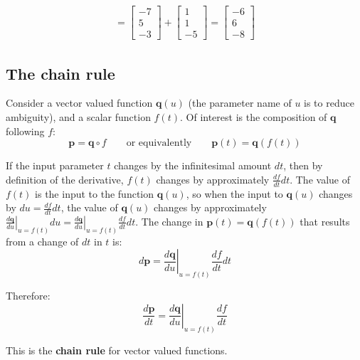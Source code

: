 \documentclass{article}
\begin{document}
\begin{itemize}
\begin{align*}
= \begin{bmatrix} -7 \\ 5 \\ -3 \end{bmatrix} + \begin{bmatrix} 1 \\ 1 \\ -5 \end{bmatrix}  
= \begin{bmatrix} -6 \\ 6 \\ -8 \end{bmatrix}
\end{align*}
\end{itemize}



\subsection*{The chain rule}

Consider a vector valued function \(\mathbf{q}(u)\) (the parameter name of \(u\) is to reduce ambiguity), and a scalar function \(f(t)\). Of interest is the composition of \(\mathbf{q}\) following \(f\): 
\[\mathbf{p} = \mathbf{q} \circ f \quad\quad\text{or equivalently}\quad\quad \mathbf{p}(t) = \mathbf{q}(f(t))\]

If the input parameter \(t\) changes by the infinitesimal amount \(dt\), then by definition of the derivative, \(f(t)\) changes by approximately \(\frac{df}{dt}dt\). The value of \(f(t)\) is the input to the function \(\mathbf{q}(u)\), so when the input to \(\mathbf{q}(u)\) changes by \(du = \frac{df}{dt}dt\), the value of \(\mathbf{q}(u)\) changes by approximately \(\left.\frac{d\mathbf{q}}{du}\right|_{u = f(t)} du = \left.\frac{d\mathbf{q}}{du}\right|_{u = f(t)} \frac{df}{dt}dt\). The change in \(\mathbf{p}(t) = \mathbf{q}(f(t))\) that results from a change of \(dt\) in \(t\) is:
\[d\mathbf{p} = \left.\frac{d\mathbf{q}}{du}\right|_{u = f(t)} \frac{df}{dt}dt\] 

Therefore:
\[\frac{d\mathbf{p}}{dt} = \left.\frac{d\mathbf{q}}{du}\right|_{u = f(t)} \frac{df}{dt}\]

This is the {\bf chain rule} for vector valued functions.

\vspace{5mm}
\end{document}
